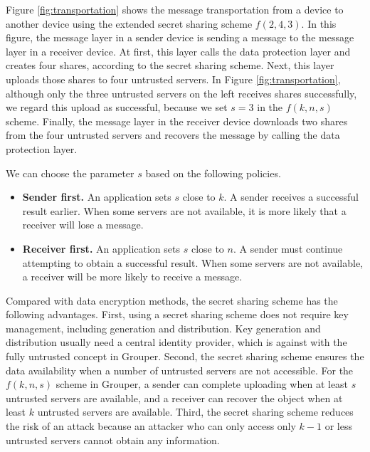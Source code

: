\documentclass[a4paper,11pt]{report}
\begin{document}
Figure \ref{fig:transportation} shows the message transportation from a device to another device using the extended secret sharing scheme $f(2, 4, 3)$.
In this figure, the message layer in a sender device is sending a message to the message layer in a receiver device.
At first, this layer calls the data protection layer and creates four shares, according to the secret sharing scheme.
Next, this layer uploads those shares to four untrusted servers.
In Figure \ref{fig:transportation}, although only the three untrusted servers on the left receives shares successfully, we regard this upload as successful, because we set $s = 3$ in the $f(k, n, s)$ scheme.
Finally, the message layer in the receiver device downloads two shares from the four untrusted servers and recovers the message by calling the data protection layer.

We can choose the parameter $s$ based on the following policies.

\begin{itemize}[leftmargin=7mm]
	\setlength{\itemsep}{1pt}
	\setlength{\parskip}{0pt}
	\setlength{\parsep}{0pt}
	\item \textbf{Sender first.} 
	An application sets $s$ close to $k$. 
	A sender receives a successful result earlier.
	When some servers are not available, it is more likely that a receiver will lose a message.
	\item \textbf{Receiver first.}
	An application sets $s$ close to $n$. 
	A sender must continue attempting to obtain a successful result.
	When some servers are not available, a receiver will be more likely to receive a message.
\end{itemize}

Compared with data encryption methods, the secret sharing scheme has the following advantages.
First, using a secret sharing scheme does not require key management, including generation and distribution.
Key generation and distribution usually need a central identity provider, which is against with the fully untrusted concept in Grouper.
Second, the secret sharing scheme ensures the data availability when a number of untrusted servers are not accessible.
For the $f(k, n, s)$ scheme in Grouper, a sender can complete uploading when at least $s$ untrusted servers are available, and a receiver can recover the object when at least $k$ untrusted servers are available.
Third, the secret sharing scheme reduces the risk of an attack because an attacker who can only access only $k-1$ or less untrusted servers cannot obtain any information.
\end{document}
